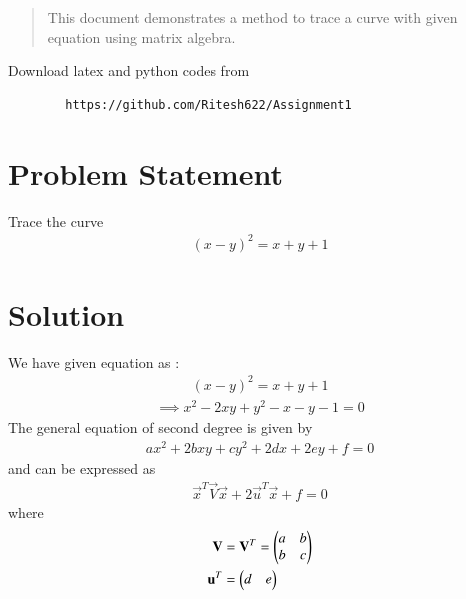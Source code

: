 \documentclass[journal,12pt,twocolumn]{IEEEtran}
\begin{document}
\maketitle
\newpage
\bigskip
\renewcommand{\thefigure}{\theenumi}
\renewcommand{\thetable}{\theenumi}
%		
%		
		\date{Today}
		
	\begin{abstract}
		This document demonstrates a method to trace a curve with given equation using matrix algebra.
		\end{abstract}	
	
		Download latex and python codes from 
		\begin{lstlisting}
		https://github.com/Ritesh622/Assignment1
		\end{lstlisting}	
	\section{Problem Statement} 
	Trace the curve 
	\begin{align}
	\left(x-y\right)^2 = x+y+1
	\label{eq0}
	\end{align}
	
	\section{Solution}	
	
	We have given equation as :
	\begin{align}
\left(x-y\right)^2 = x+y+1
\end{align}	
\begin{align}
\implies x^2  -2xy + y^2 -x - y -1 = 0
\label{eq1}
\end{align}
The general equation of second degree is given by
\begin{align}
ax^2+2bxy+cy^2+2dx+2ey+f=0 \label{eq2}
\end{align}
and can be expressed as
\begin{align}
\vec{x}^T\vec{V}\vec{x}+2\vec{u}^T\vec{x}+f=0 \label{eq3}
\end{align}
where
\begin{align}
\mathbf{V} &= \mathbf{V}^T = \begin{pmatrix}a & b \\ b & c\end{pmatrix}
\\
\mathbf{u}^T &= \begin{pmatrix}d & e\end{pmatrix}
\end{align}
\end{document}
